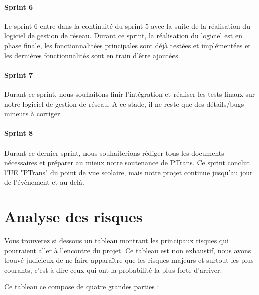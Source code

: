\documentclass[french]{article}
\begin{document}
\paragraph{Sprint 6}
Le sprint 6 entre dans la continuité du sprint 5 avec la suite de la réalisation du logiciel de gestion de réseau.
Durant ce sprint, la réalisation du logiciel est en phase finale, les fonctionnalitées principales sont déjà testées et implémentées et les dernières fonctionnalités sont en train d'être ajoutées.

\paragraph{Sprint 7}
Durant ce sprint, nous souhaitons finir l'intégration et réaliser les tests finaux sur notre logiciel de gestion de réseau.
A ce stade, il ne reste que des détails/bugs mineurs à corriger.

\paragraph{Sprint 8}
Durant ce dernier sprint, nous souhaiterions rédiger tous les documents nécessaires et préparer au mieux notre soutenance de PTrans.
Ce sprint conclut l'UE "PTrans" du point de vue scolaire, mais notre projet continue jusqu'au jour de l'évènement et au-delà.


\section{Analyse des risques}

Vous trouverez si dessous un tableau montrant les principaux risques qui pourraient aller à l'encontre du projet. Ce tableau est non exhaustif, nous avons trouvé judicieux de ne faire apparaître que les risques majeurs et surtout les plus courants, c'est à dire ceux qui ont la probabilité la plus forte d'arriver.

Ce tableau ce compose de quatre grandes parties :
\end{document}

